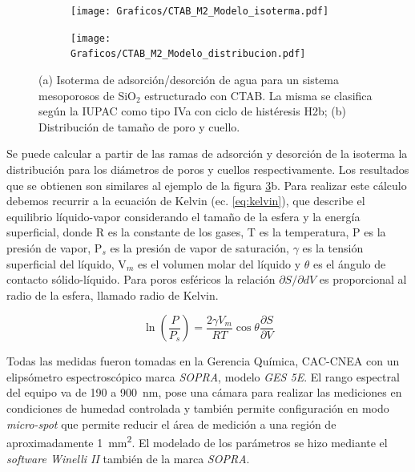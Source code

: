 			\begin{figure}[!ht]
		     	  		\begin{subfigure}[t]{0.491\textwidth}
		     	  		\texttt{[image: Graficos/CTAB\_M2\_Modelo\_isoterma.pdf]}
						\label{fig:pea_ej1}
						\end{subfigure}
						\begin{subfigure}[t]{0.495\textwidth}
		     	  		\texttt{[image: Graficos/CTAB\_M2\_Modelo\_distribucion.pdf]}
						\label{fig:pea_ej2}
						\end{subfigure}
						\vspace*{-0.6cm}
						\caption[Isoterma de adsorción/desorción tipo IVa, H2b.]{(a) Isoterma de adsorción/desorción de agua para un sistema mesoporosos de SiO$_2$ estructurado con CTAB. La misma se clasifica según la IUPAC como tipo IVa con ciclo de histéresis H2b; (b) Distribución de tamaño de poro y cuello.}
						\label{fig:pea_ej}
						\end{figure}			
		\vspace{0.3cm}				
		Se puede calcular a partir de las ramas de adsorción y desorción de la isoterma la distribución para los diámetros de poros y cuellos respectivamente. Los resultados que se obtienen son similares al ejemplo de la figura \ref{fig:pea_ej}b. Para realizar este cálculo debemos recurrir a la ecuación de Kelvin (ec. \ref{eq:kelvin}), que describe el equilibrio líquido-vapor considerando el tamaño de la esfera y la energía superficial, donde R es la constante de los gases, T es la temperatura, P es la presión de vapor, P$_s$ es la presión de vapor de saturación, $\gamma$ es la tensión superficial del líquido, V$_m$ es el volumen molar del líquido y $\theta$ es el ángulo de contacto sólido-líquido. \cite{Baklanov2000,Boissiere2005,Sing1985} Para poros esféricos la relación $\partial S/ \partial dV$ es proporcional al radio de la esfera, llamado radio de Kelvin.\cite{FernandezPrini2005}
		
			\begin{equation}
			  	 \ln \left(\frac{P}{P_s}\right)=\frac{2\gamma V_m}{RT} \cos{\theta}\frac{\partial S}{\partial V}
			     \label{eq:kelvin}
			 	 \end{equation}					
	
		Todas las medidas fueron tomadas en la Gerencia Química, CAC-CNEA con un elipsómetro espectroscópico marca \textit{SOPRA}, modelo \textit{GES 5E}. El rango espectral del equipo va de 190 a \SI{900}{\nm}, pose una cámara para realizar las mediciones en condiciones de humedad controlada y también permite configuración en modo \textit{micro-spot} que permite reducir el área de medición a una región de aproximadamente \SI{1}{\mm^2}. El modelado de los parámetros se hizo mediante el \textit{software Winelli II} también de la marca \textit{SOPRA}.
			

